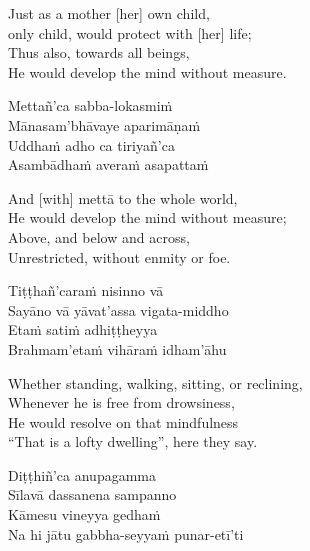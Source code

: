 \begin{english-verses}
  Just as a mother [her] own child,\\\relax
  [Her] only child, would protect with [her] life; \\
  Thus also, towards all beings,\\
  He would develop the mind without measure.
\end{english-verses}

\begin{pali-hang-continued}
  Mettañ'ca sabba-lokasmiṁ\\
  Mānasam'bhāvaye aparimāṇaṁ\\
  Uddhaṁ adho ca tiriyañ'ca\\
  Asambādhaṁ averaṁ asapattaṁ
\end{pali-hang-continued}

\begin{english-verses}
  And [with] mettā to the whole world,\\
  He would develop the mind without measure;\\
  Above, and below and across,\\
  Unrestricted, without enmity or foe.
\end{english-verses}

\begin{pali-hang-continued}
  Tiṭṭhañ'caraṁ nisinno vā\\
  Sayāno vā yāvat'assa vigata-middho\\
  Etaṁ satiṁ adhiṭṭheyya\\
  Brahmam'etaṁ vihāraṁ idham'āhu
\end{pali-hang-continued}

\begin{english-verses}
  Whether standing, walking, sitting, or reclining,\\
  Whenever he is free from drowsiness,\\
  He would resolve on that mindfulness\\
  ``That is a lofty dwelling'', here they say.
\end{english-verses}

\begin{pali-hang-continued}
  Diṭṭhiñ'ca anupagamma\\
  Sīlavā dassanena sampanno\\
  Kāmesu vineyya gedhaṁ\\
  Na hi jātu gabbha-seyyaṁ punar-etī'ti
\end{pali-hang-continued}

